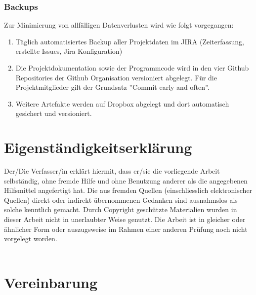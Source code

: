 \documentclass[11pt,a4paper,english,oneside]{book}
\numberwithin{equation}{chapter}
\begin{document}
	\subsection{Backups}
		\label{sec:backup}
		Zur Minimierung von allfälligen Datenverlusten wird wie folgt vorgegangen:
	
	\begin{enumerate}
		\item Täglich automatisiertes Backup aller Projektdaten im JIRA \cite{jira} (Zeiterfassung, erstellte Issues, Jira Konfiguration)
		\item Die Projektdokumentation sowie der Programmcode wird in den vier Github Repositories der Github Organisation \cite{github} versioniert abgelegt. Für die Projektmitglieder gilt der Grundsatz ''Commit early and often''.
		\item Weitere Artefakte werden auf Dropbox \cite{dropbox} abgelegt und dort automatisch gesichert und versioniert.
	\end{enumerate}
	
	
	\newpage
	
	\appendix
	\noappendicestocpagenum
	\addappheadtotoc
	\appendixpage
	
	\printglossary
	\glsaddall
	
	\printbibliography[heading=bibintoc]
	
	\listoffigures
	
	\listoftables
	
	\chapter{Eigenständigkeitserklärung}
	Der/Die Verfasser/in erklärt hiermit, dass er/sie die vorliegende Arbeit selbständig, ohne fremde Hilfe und ohne Benutzung anderer als die angegebenen Hilfsmittel angefertigt hat. Die aus fremden Quellen (einschliesslich elektronischer Quellen) direkt oder indirekt übernommenen Gedanken sind ausnahmslos als solche kenntlich gemacht. Durch Copyright geschützte Materialien wurden in dieser Arbeit nicht in unerlaubter Weise genutzt. Die Arbeit ist in gleicher oder ähnlicher Form oder auszugsweise im Rahmen einer anderen Prüfung noch nicht vorgelegt worden.\\[2cm]
	 \hfill {}
	\hfill \\[2cm]
	 \hfill {}
	
	\chapter{Vereinbarung}
	
\end{document}
